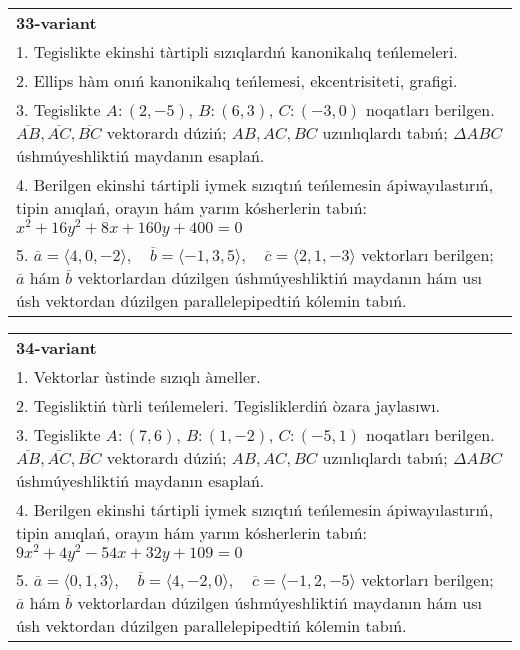 \documentclass{article}
\begin{document}
\begin{tabular}{m{17cm}}
\textbf{33-variant}\\
1. Tegislikte ekinshi tàrtipli sızıqlardıń kanonikalıq teńlemeleri.\\

2. Ellips hàm onıń kanonikalıq teńlemesi, ekcentrisiteti, grafigi.\\

3. Tegislikte $A: (2, -5)$, $B: (6, 3)$, $C: (-3, 0)$ noqatları berilgen. $\overline{AB}, \overline{AC}, \overline{BC}$ vektorardı dúziń; $AB, AC, BC$ uzınlıqlardı tabıń; $\Delta ABC$ úshmúyeshliktiń maydanın esaplań. \\

4. Berilgen ekinshi tártipli iymek sızıqtıń teńlemesin ápiwayılastırıń, tipin anıqlań, orayın hám yarım kósherlerin tabıń: $x^2+16y^2+8x+160y+400=0$\\

5. \(\overline{a} = \langle 4, 0, -2 \rangle, \quad \overline{b} = \langle -1, 3, 5 \rangle, \quad \overline{c} = \langle 2, 1, -3 \rangle\) vektorları berilgen; \(\overline{a}\) hám \(\overline{b}\) vektorlardan dúzilgen úshmúyeshliktiń maydanın hám usı úsh vektordan dúzilgen parallelepipedtiń kólemin tabıń.
\end{tabular}
\vspace{1cm}


\begin{tabular}{m{17cm}}
\textbf{34-variant}\\
1. Vektorlar ùstinde sızıqlı àmeller.\\

2. Tegisliktiń tùrli teńlemeleri. Tegisliklerdiń òzara jaylasıwı.\\

3. Tegislikte $A: (7, 6)$, $B: (1, -2)$, $C: (-5, 1)$ noqatları berilgen. $\overline{AB}, \overline{AC}, \overline{BC}$ vektorardı dúziń; $AB, AC, BC$ uzınlıqlardı tabıń; $\Delta ABC$ úshmúyeshliktiń maydanın esaplań. \\

4. Berilgen ekinshi tártipli iymek sızıqtıń teńlemesin ápiwayılastırıń, tipin anıqlań, orayın hám yarım kósherlerin tabıń: $9x^2+4y^2-54x+32y+109=0$\\

5. \(\overline{a} = \langle 0, 1, 3 \rangle, \quad \overline{b} = \langle 4, -2, 0 \rangle, \quad \overline{c} = \langle -1, 2, -5 \rangle\) vektorları berilgen; \(\overline{a}\) hám \(\overline{b}\) vektorlardan dúzilgen úshmúyeshliktiń maydanın hám usı úsh vektordan dúzilgen parallelepipedtiń kólemin tabıń.
\end{tabular}
\vspace{1cm}
\end{document}
